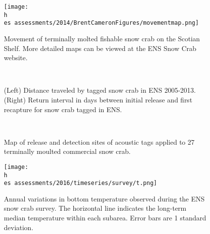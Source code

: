 \documentclass[11pt]{article}
\newcommand{\h}{/home/hubleyb/}
\newcommand{\es}{bio.data/bio.snowcrab/}
\begin{document}
\begin{figure}
\centering
\texttt{[image: \\h \\es assessments/2014/BrentCameronFigures/movementmap.png]}
\caption{Movement of terminally molted fishable snow crab on the Scotian Shelf. More detailed maps can be viewed at the ENS Snow Crab website.}
\end{figure}

\begin{figure}
\centering
{}\
\\

\caption{(Left) Distance traveled by tagged snow crab in ENS 2005-2013. (Right) Return interval in days between initial release and first recapture for snow crab tagged in ENS.}
\end{figure}
\clearpage


\begin{figure}
\centering
{}\

\caption{Map of release and detection sites of acoustic tags applied to 27 terminally moulted commercial snow crab.}
\end{figure}
\clearpage


\begin{figure}
\centering
\texttt{[image: \\h \\es assessments/2016/timeseries/survey/t.png]} %
\caption{Annual variations in bottom temperature observed during the ENS snow crab survey. The horizontal line indicates the long-term median temperature within each subarea. Error bars are 1 standard deviation. }
\end{figure}
\clearpage
\end{document}
